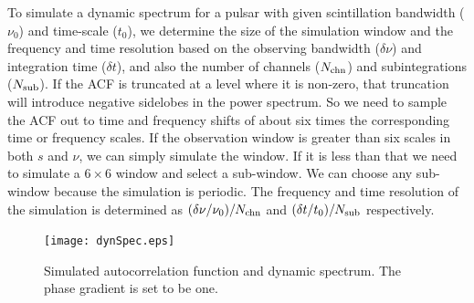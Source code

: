 \documentclass[useAMS,usenatbib]{mn2e}
\begin{document}
To simulate a dynamic spectrum for a pulsar with given scintillation bandwidth ($\nu_0$) 
and time-scale ($t_0$), we determine the size of the simulation window and the frequency 
and time resolution based on the observing bandwidth ($\delta\nu$) and integration time 
($\delta t$), and also the number of channels ($N_{\rm{chn}}$) and subintegrations ($N_{\rm{sub}}$).
%
If the ACF is truncated at a level where it is non-zero, that truncation will introduce 
negative sidelobes in the power spectrum. So we need to sample the ACF out to time and frequency 
shifts of about six times the corresponding time or frequency scales. If the observation 
window is greater than six scales in both $s$ and $\nu$, we can simply simulate the 
window. If it is less than that we need to simulate a $6\times6$ window and select 
a sub-window. We can choose any sub-window because the simulation is periodic. 
%
The frequency and time resolution of the simulation is determined as $(\delta\nu/\nu_0)/N_{\rm{chn}}$
and $(\delta t/t_0)/N_{\rm{sub}}$ respectively.

\begin{figure}
\begin{center}
\texttt{[image: dynSpec.eps]}
\end{center}
\caption{Simulated autocorrelation function and dynamic spectrum. The 
phase gradient is set to be one.}
\label{acffig}
\end{figure}
\end{document}
